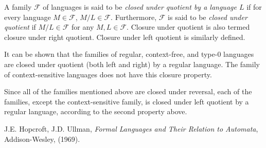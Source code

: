 \documentclass[12pt]{article}
\begin{document}
A family $\mathscr{F}$ of languages is said to be \emph{closed under quotient by a language $L$} if for every language $M\in \mathscr{F}$, $M / L\in \mathscr{F}$.  Furthermore, $\mathscr{F}$ is said to be \emph{closed under quotient} if $M/L \in \mathscr{F}$ for any $M,L\in\mathscr{F}$.  Closure under quotient is also termed closure under right quotient.  Closure under left quotient is similarly defined.

It can be shown that the families of regular, context-free, and type-0 languages are closed under quotient (both left and right) by a regular language.  The family of context-sensitive languages does not have this closure property.  

Since all of the families mentioned above are closed under reversal, each of the families, except the context-sensitive family, is closed under left quotient by a regular language, according to the second property above.

\begin{thebibliography}{9}
 J.E. Hopcroft, J.D. Ullman, {\em Formal Languages and Their Relation to Automata}, Addison-Wesley, (1969).
\end{thebibliography}
\end{document}
